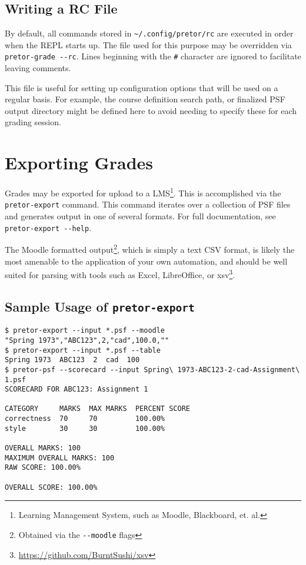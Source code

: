 \documentclass{book}
\begin{document}
\subsection{Writing a RC File} \label{sec:rcfile}

By default, all commands stored in \texttt{\textasciitilde/.config/pretor/rc} are executed in
order when the REPL starts up. The file used for this purpose may be overridden
via \texttt{pretor-grade -{}-rc}. Lines beginning with the \texttt{\#}
character are ignored to facilitate leaving comments.

This file is useful for setting up configuration options that will be used on a
regular basis. For example, the course definition search path, or finalized PSF
output directory might be defined here to avoid needing to specify these for
each grading session.

\section{Exporting Grades}

Grades may be exported for upload to a LMS\footnote{Learning Management System,
such as Moodle, Blackboard, et. al.}. This is accomplished via the
\texttt{pretor-export} command. This command iterates over a collection of PSF
files and generates output in one of several formats. For full documentation,
see \texttt{pretor-export -{}-help}.

The Moodle formatted output\footnote{Obtained via the \texttt{-{}-moodle}
flags}, which is simply a text CSV format, is likely the most amenable to the
application of your own automation, and should be well suited for parsing with
tools such as Excel, LibreOffice, or
xsv\footnote{\url{https://github.com/BurntSushi/xsv}}.

\subsection{Sample Usage of \texttt{pretor-export}}

\begin{verbatim}
$ pretor-export --input *.psf --moodle
"Spring 1973","ABC123",2,"cad",100.0,""
$ pretor-export --input *.psf --table
Spring 1973  ABC123  2  cad  100
$ pretor-psf --scorecard --input Spring\ 1973-ABC123-2-cad-Assignment\ 1.psf
SCORECARD FOR ABC123: Assignment 1

CATEGORY     MARKS  MAX MARKS  PERCENT SCORE
correctness  70     70         100.00%
style        30     30         100.00%

OVERALL MARKS: 100
MAXIMUM OVERALL MARKS: 100
RAW SCORE: 100.00%

OVERALL SCORE: 100.00%
\end{verbatim}
\end{document}
